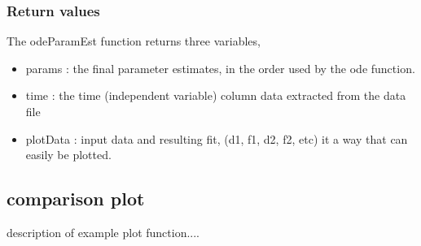 \documentclass[10pt]{article}
\theoremstyle{plain}
\begin{document}
\subsubsection{Return values}
The odeParamEst function
returns three variables,
\begin{itemize}
\item params : the final parameter estimates, in the order used by the ode
function.
\item time : the time (independent variable) column data extracted from the
data file
\item plotData : input data and resulting fit, (d1, f1, d2, f2, etc) it a
way that can easily be plotted.
\end{itemize}


\subsection{comparison plot}
description of example plot function....
\end{document}
